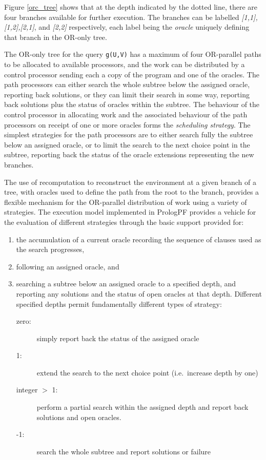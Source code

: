 Figure \ref{orc_tree} shows that at the depth indicated by the dotted line, there are
four branches available for further execution.  The branches can be labelled
\textit{[1,1], [1,2],[2,1]}, and \textit{[2,2]} respectively, each label being the \textit{oracle}
uniquely defining that branch in the OR-only tree.

The OR-only tree for the query \texttt{g(U,V)} has a maximum of four OR-parallel paths
to be allocated to available processors, and the work can be distributed by a control
processor sending each a copy of the program and one of the oracles.  The path processors
can either search the whole subtree below the assigned oracle, reporting back solutions,
or they can limit their search in some way, reporting back solutions plus the status
of oracles within the subtree.  The behaviour of the control processor in allocating
work and the associated behaviour of the path processors on receipt of one or more
oracles forms the \textit{scheduling strategy}.  The simplest strategies for the path
processors are to either search fully the subtree below an assigned oracle, or to
limit the search to the next choice point in the subtree, reporting back the status of
the oracle extensions representing the new branches.

The use of recomputation to reconstruct the environment at a given branch of a tree,
with oracles used to define the path from the root to the branch, provides a 
flexible mechanism for the OR-parallel distribution of work using a variety of
strategies.  The execution model implemented in PrologPF provides a vehicle for the
evaluation of different strategies through the basic support provided for:
\begin{enumerate}
\item{the accumulation of a current oracle recording the sequence of clauses used as
  the search progresses,}
\item{following an assigned oracle, and}
\item{searching a subtree below an assigned oracle to a specified depth, and
  reporting any solutions and the status of open oracles at that depth.  Different
  specified depths permit fundamentally different types of strategy:
  \begin{description}
  \item[zero:]{ simply report back the status of the assigned oracle}
  \item[1:]{ extend the search to the next choice point (i.e.\ increase depth by one)}
  \item[integer $>$ 1:]{ perform a partial search within the assigned depth
    and report back solutions and open
    oracles.}
  \item[-1:]{ search the whole subtree and report solutions or failure}
  \end{description}}
\end{enumerate}

